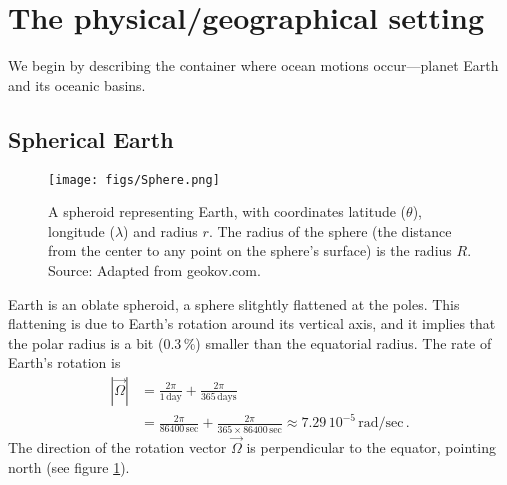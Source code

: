 \documentclass[11pt]{article}
\newcommand{\per}{\,.}
\begin{document}
\section{The physical/geographical setting}


We begin by describing the container where ocean motions occur---planet Earth
and its oceanic basins.

\subsection{Spherical Earth}

\begin{figure}[ht]
\centering
\texttt{[image: figs/Sphere.png]}
\caption{\small A spheroid representing Earth, with coordinates latitude ($\theta$),
longitude ($\lambda$) and radius $r$. The radius of the sphere (the distance from the center
to any point on the sphere's surface) is the radius $R$. Source: Adapted from geokov.com.}
\label{EarthSphere}
\end{figure}

 Earth is an oblate spheroid, a sphere slitghtly
flattened at the poles. This flattening is due to Earth's rotation around its vertical
axis, and it implies
that the polar radius is a bit (0.3\,\%) smaller than the equatorial radius. The rate
of Earth's rotation is
\begin{align}
|\vec{\Omega}| &= \frac{2\pi}{1\, \text{day}} + \frac{2\pi}{365\, \text{days}}\nonumber\\
               &= \frac{2\pi}{86400\, \text{sec}} + \frac{2\pi}{365 \times 86400 \, \text{sec}}
               \approx 7.29\, 10^{-5}\, \text{rad}/\text{sec}\per
\end{align}
The direction of the rotation vector $\vec{\Omega}$ is perpendicular to the equator, pointing north (see figure \ref{EarthSphere}).
\end{document}
